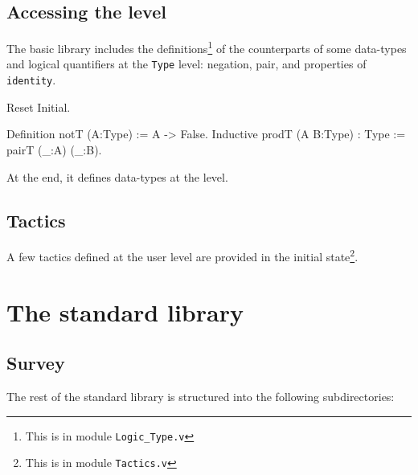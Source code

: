\subsection{Accessing the {\Type} level}

The basic library includes the definitions\footnote{This is in module
{\tt Logic\_Type.v}} of the counterparts of some data-types and logical
quantifiers at the \verb:Type: level: negation, pair, and properties
of {\tt identity}.

\begin{coq_eval}
Reset Initial.
\end{coq_eval}
\begin{coq_example*}
Definition notT (A:Type) := A -> False.
Inductive prodT (A B:Type) : Type := pairT (_:A) (_:B).
\end{coq_example*}

At the end, it defines data-types at the {\Type} level.

\subsection{Tactics}

A few tactics defined at the user level are provided in the initial
state\footnote{This is in module {\tt Tactics.v}}.

\section{The standard library}

\subsection{Survey}

The rest of the standard library is structured into the following 
subdirectories:

